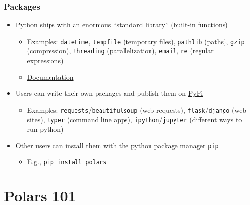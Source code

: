 \documentclass{ali-presentation}
\begin{document}
\begin{frame}
    \frametitle{Packages}

    \begin{itemize}
        \item Python ships with an enormous ``standard library'' (built-in functions)
            \begin{itemize}
                \item Examples: \texttt{datetime}, \texttt{tempfile} (temporary files), \texttt{pathlib} (paths), \texttt{gzip} (compression), \texttt{threading} (parallelization), \texttt{email}, \texttt{re} (regular expressions)
                \item \href{https://docs.python.org/3/library/index.html}{Documentation}
            \end{itemize}
        \item Users can write their own packages and publish them on \href{https://pypi.org}{PyPi}
            \begin{itemize}
                \item Examples: \texttt{requests}/\texttt{beautifulsoup} (web requests), \texttt{flask}/\texttt{django} (web sites), \texttt{typer} (command line apps), \texttt{ipython}/\texttt{jupyter} (different ways to run python)
            \end{itemize}
        \item Other users can install them with the python package manager \texttt{pip}
            \begin{itemize}
                \item E.g., \texttt{pip install polars}
            \end{itemize}
    \end{itemize}
\end{frame}

\section{Polars 101}

\end{document}
